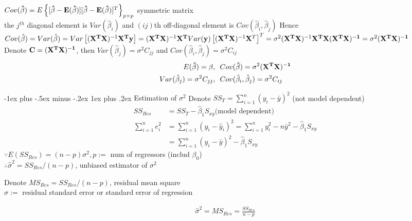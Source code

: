 \documentclass[a4paper,12pt,landscape]{article}
\makeatletter
\renewcommand{\subsubsection}{\@startsection{subsubsection}{3}{0mm}%
                                {-1ex plus -.5ex minus -.2ex}%
                                {1ex plus .2ex}%
                                {\normalfont\small\bfseries\color{violet}}}
\makeatother
\begin{document}
\begin{multicols}{3}
            $Cov(\bold{\hat\beta})=E\left\{[\bold{\hat\beta-E(\hat\beta)}][\bold{\hat\beta-E(\hat\beta)}]^T\right\}_{p\times
            p}$ symmetric matrix\\
            the $j^{th}$ diagonal element is $Var(\hat\beta_i)$ and $(ij)$th
            off-diagonal element is $Cov(\hat\beta_i, \hat\beta_j)$ Hence\\
            $Cov(\hat\beta)=Var(\hat\beta)=Var\left[(\bold{X^TX})^{-1}\bold{X^Ty}\right]=(\bold{X^TX})^{-1}\bold{X^T}Var(\bold{y})\left[(\bold{X^TX})^{-1}\bold{X}^T\right]^T=\sigma^2(\bold{X^TX})^{-1}\bold{X^TX(X^TX)^{-1}}=\sigma^2\bold{(X^TX)^{-1}}$\\
            Denote $\bold{C=(X^TX)^{-1}}$, then
            $Var(\hat\beta_j)=\sigma^2C_{jj}$ and
            $Cov(\hat\beta_i,\hat\beta_j)=\sigma^2C_{ij}$
            \begin{align*}
                E(\bold{\hat\beta}) = \bold{\beta}, &~~Cov(\bold{\hat\beta})=\sigma^2\bold{(X^TX)^{-1}}\\
                Var(\hat\beta_j) = \sigma^2C_{jj}, &~~Cov(\hat\beta_i, \hat\beta_j)=\sigma^2C_{ij}
            \end{align*}

		\subsubsection{Estimation of $\sigma^2$}
			Denote $SS_T = \sum_{i=1}^n(y_i-\bar y)^2$ (not model dependent)
			\begin{align*}
				SS_{Res} &= SS_T - \hat\beta_1S_{xy} \text{(model dependent)}\\
				\sum_{i=1}^ne_i^2 &= \sum_{i=1}^n(y_i-\hat y_i)^2 = \sum_{i=1}^ny_i^2-n\bar y^2 - \hat\beta_1S_{xy}\\
				&= \sum_{i=1}^n(y_i-\bar y)^2 - \hat\beta_1 S_{xy}
			\end{align*}
			$\because E(SS_{Res}) = (n-p)\sigma^2, p:=$ num of regressors (includ $\beta_0$)\\
			$\therefore \hat\sigma^2 = SS_{Res}/(n-p)$, unbiased estimator of $\sigma^2$

			Denote $MS_{Res} = SS_{Res} / (n-p)$, residual mean square\\
			$\hat\sigma :=$ residual standard error or standard error of regression

            \begin{align*}
                \hat\sigma^2 = MS_{Res} = \frac{SS_{Res}}{n-p}
            \end{align*}


\end{multicols}
\end{document}
